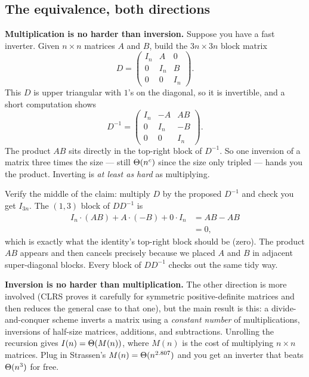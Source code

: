 \subsection{The equivalence, both directions}

\textbf{Multiplication is no harder than inversion.} Suppose you have a fast
inverter. Given $n\times n$ matrices $A$ and $B$, build the $3n\times 3n$ block
matrix
$$
D=\begin{pmatrix} I_n & A & 0\\ 0 & I_n & B\\ 0 & 0 & I_n\end{pmatrix}.
$$
This $D$ is upper triangular with $1$'s on the diagonal, so it is invertible, and a
short computation shows
$$
D^{-1}=\begin{pmatrix} I_n & -A & AB\\ 0 & I_n & -B\\ 0 & 0 & I_n\end{pmatrix}.
$$
The product $AB$ sits directly in the top-right block of $D^{-1}$. So one
inversion of a matrix three times the size --- still $\Theta(n^c)$ since the size only
tripled --- hands you the product. Inverting is \emph{at least as hard} as
multiplying.

\begin{example}
\label{ch27:inv-gives-mult}
Verify the middle of the claim: multiply $D$ by the proposed $D^{-1}$ and check you
get $I_{3n}$. The $(1,3)$ block of $DD^{-1}$ is
\begin{align*}
I_n\cdot(AB)+A\cdot(-B)+0\cdot I_n &= AB-AB \\
&= 0,
\end{align*}
which is exactly what the identity's top-right block should be (zero). The product
$AB$ appears and then cancels precisely because we placed $A$ and $B$ in adjacent
super-diagonal blocks. Every block of $DD^{-1}$ checks out the same tidy way.
\end{example}

\textbf{Inversion is no harder than multiplication.} The other direction is more
involved (CLRS proves it carefully for symmetric positive-definite matrices and
then reduces the general case to that one), but the main result is this: a
divide-and-conquer scheme inverts a matrix using a \emph{constant number} of
multiplications, inversions of half-size matrices, additions, and subtractions.
Unrolling the recursion gives $I(n)=\Theta(M(n))$, where $M(n)$ is the cost of
multiplying $n\times n$ matrices. Plug in Strassen's $M(n)=\Theta(n^{2.807})$ and you
get an inverter that beats $\Theta(n^3)$ for free.

